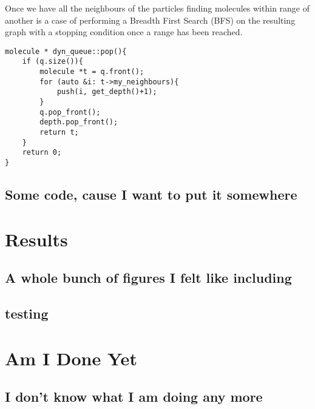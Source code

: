 Once we have all the neighbours of the particles finding molecules within range of another is a case of performing a Breadth First Search (BFS) on the resulting graph with a stopping condition once a range has been reached.

\begin{lstlisting}[language=myc]
molecule * dyn_queue::pop(){
    if (q.size()){
        molecule *t = q.front();
        for (auto &i: t->my_neighbours){
            push(i, get_depth()+1);
        }
        q.pop_front();
        depth.pop_front();
        return t;
    }
    return 0;
}
\end{lstlisting}

\section{Some code, cause I want to put it somewhere}

\chapter{Results}

\section{A whole bunch of figures I felt like including}
\pagebreak
\section{testing}

\chapter{Am I Done Yet}

\section{I don't know what I am doing any more}

\endbackmatter
